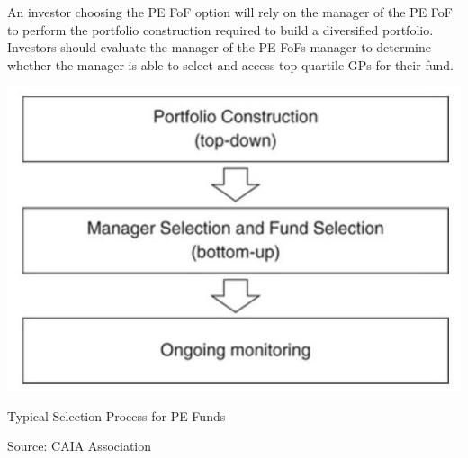 \documentclass[11pt]{article}
\begin{document}
An investor choosing the PE FoF option will rely on the manager of the PE FoF to perform the portfolio construction required to build a diversified portfolio. Investors should evaluate the manager of the PE FoFs manager to determine whether the manager is able to select and access top quartile GPs for their fund.

\begin{center}
\includegraphics[max width=\textwidth]{2024_04_10_45ef17878a276b09aeb7g-3}
\end{center}

Typical Selection Process for PE Funds

Source: CAIA Association
\end{document}
